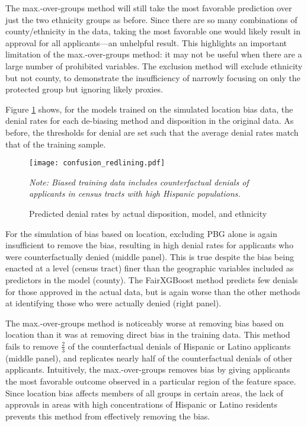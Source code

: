The max.-over-groups method will still take the most favorable prediction over just the two ethnicity groups as before. Since there are so many combinations of county/ethnicity in the data, taking the most favorable one would likely result in approval for all applicants---an unhelpful result. This highlights an important limitation of the max.-over-groups method: it may not be useful when there are a large number of prohibited variables. The exclusion method will exclude ethnicity but not county, to demonstrate the insufficiency of narrowly focusing on only the protected group but ignoring likely proxies.

Figure \ref{fig:redlining} shows, for the models trained on the simulated location bias data, the denial rates for each de-biasing method and disposition in the original data. As before, the thresholds for denial are set such that the average denial rates match that of the training sample. 

\begin{figure}[h]
	\centering
	\begin{minipage}{\linewidth}
		\texttt{[image: confusion\_redlining.pdf]}
		\begin{flushright}
			\scriptsize{\emph{Note: Biased training data includes counterfactual denials of applicants in census tracts with high Hispanic populations.}}
		\end{flushright}
	\end{minipage}
\caption{Predicted denial rates by actual disposition, model, and ethnicity\label{fig:redlining}}
\end{figure}

For the simulation of bias based on location, excluding PBG alone is again insufficient to remove the bias, resulting in high denial rates for applicants who were counterfactually denied (middle panel). This is true despite the bias being enacted at a level (census tract) finer than the geographic variables included as predictors in the model (county). The FairXGBoost method predicts few denials for those approved in the actual data, but is again worse than the other methods at identifying those who were actually denied (right panel). 

The max.-over-groups method is noticeably worse at removing bias based on location than it was at removing direct bias in the training data. This method fails to remove $\frac{2}{3}$ of the counterfactual denials of Hispanic or Latino applicants (middle panel), and replicates nearly half of the counterfactual denials of other applicants. Intuitively, the max.-over-groups removes bias by giving applicants the most favorable outcome observed in a particular region of the feature space. Since location bias affects members of all groups in certain areas, the lack of approvals in areas with high concentrations of Hispanic or Latino residents prevents this method from effectively removing the bias.

